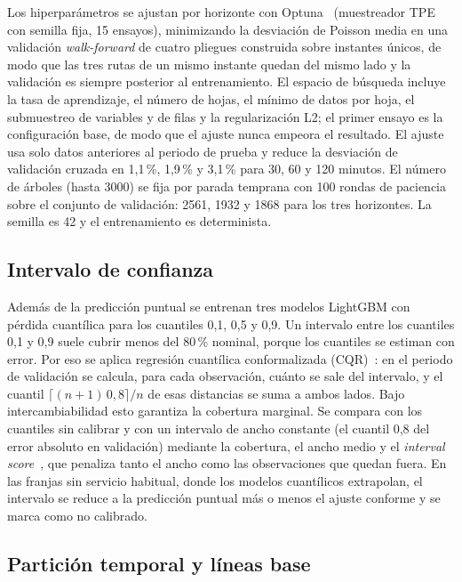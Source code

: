\documentclass[11pt,a4paper]{article}
\begin{document}
Los hiperparámetros se ajustan por horizonte con Optuna~\cite{akiba2019optuna} (muestreador TPE con semilla fija, 15 ensayos), minimizando la desviación de Poisson media en una validación \emph{walk-forward} de cuatro pliegues construida sobre instantes únicos, de modo que las tres rutas de un mismo instante quedan del mismo lado y la validación es siempre posterior al entrenamiento. El espacio de búsqueda incluye la tasa de aprendizaje, el número de hojas, el mínimo de datos por hoja, el submuestreo de variables y de filas y la regularización L2; el primer ensayo es la configuración base, de modo que el ajuste nunca empeora el resultado. El ajuste usa solo datos anteriores al periodo de prueba y reduce la desviación de validación cruzada en 1,1\,\%, 1,9\,\% y 3,1\,\% para 30, 60 y 120 minutos. El número de árboles (hasta 3000) se fija por parada temprana con 100 rondas de paciencia sobre el conjunto de validación: 2561, 1932 y 1868 para los tres horizontes. La semilla es 42 y el entrenamiento es determinista.

\subsection{Intervalo de confianza}

Además de la predicción puntual se entrenan tres modelos LightGBM con pérdida cuantílica para los cuantiles 0,1, 0,5 y 0,9. Un intervalo entre los cuantiles 0,1 y 0,9 suele cubrir menos del 80\,\% nominal, porque los cuantiles se estiman con error. Por eso se aplica regresión cuantílica conformalizada (CQR)~\cite{romano2019conformalized}: en el periodo de validación se calcula, para cada observación, cuánto se sale del intervalo, y el cuantil $\lceil (n+1)\,0{,}8 \rceil / n$ de esas distancias se suma a ambos lados. Bajo intercambiabilidad esto garantiza la cobertura marginal. Se compara con los cuantiles sin calibrar y con un intervalo de ancho constante (el cuantil 0,8 del error absoluto en validación) mediante la cobertura, el ancho medio y el \emph{interval score}~\cite{gneiting2007strictly}, que penaliza tanto el ancho como las observaciones que quedan fuera. En las franjas sin servicio habitual, donde los modelos cuantílicos extrapolan, el intervalo se reduce a la predicción puntual más o menos el ajuste conforme y se marca como no calibrado.

\subsection{Partición temporal y líneas base}
\end{document}
